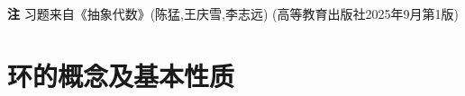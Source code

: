 \newenvironment{solution}{\begin{proof}[解]}{\end{proof}}

\textbf{注} \quad 习题来自《抽象代数》(陈猛,王庆雪,李志远) (高等教育出版社2025年9月第1版)

\section{环的概念及基本性质}

